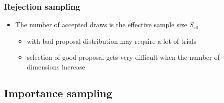 \documentclass[10pt]{beamer}
\begin{document}
\begin{frame}
\frametitle{Rejection sampling}

\begin{itemize}
  \item The number of accepted draws is the effective sample size $S_\text{eff}$

  \pause
    \begin{itemize}
    \item with bad proposal distribution may require a lot of trials
    \item selection of good proposal gets very difficult when
      the number of dimensions increase
    \end{itemize}
  \end{itemize}

\end{frame}

\subsection{Importance sampling}
\end{document}

